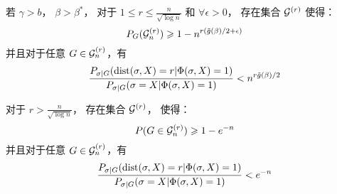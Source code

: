 \begin{lemma}\label{prop:small}
  若 $\gamma>b$， $\beta>\beta^\ast$，
  对于 $1\leq r \leq \frac{n}{\sqrt{\log n}}$
  和 $\forall \epsilon > 0$，
  存在集合 $\mathcal{G}^{(r)}$ 使得：
\begin{equation}\label{eq:Gr}
  P_G(\mathcal{G}^{(r)}_n) \geqslant 1 - n^{r(\tilde{g}(\beta)/2 + \epsilon)}
  \end{equation}
  并且对于任意 $G\in\mathcal{G}^{(r)}_n$，有
\begin{equation}\label{eq:psigmaX}
  \frac{P_{\sigma|G}(\operatorname{dist}(\sigma, X)=r | \Phi(\sigma, X)=1)}
  {P_{\sigma|G}(\sigma=X | \Phi(\sigma, X)=1)} <
  n^{r \tilde{g}(\beta) /2}
  \end{equation}
  
  对于 $r> \frac{n}{\sqrt{\log n}}$， 存在集合 $\mathcal{G}^{(r)}$， 使得：
\begin{equation}\label{eq:Gr1}
  P(G\in\mathcal{G}^{(r)}_n) \geqslant 1 - e^{-n}
  \end{equation}
  并且对于任意 $G\in\mathcal{G}^{(r)}_n$，有
\begin{equation}\label{eq:psigmaX1}
  \frac{P_{\sigma|G}(\operatorname{dist}(\sigma, X)=r | \Phi(\sigma, X)=1)}
  {P_{\sigma|G}(\sigma=X | \Phi(\sigma, X)=1)} <
  e^{-n}
  \end{equation}
\end{lemma}
